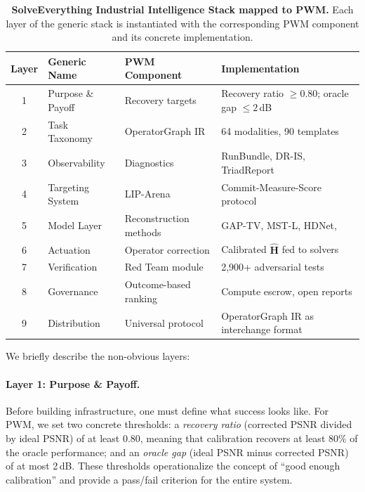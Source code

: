 \begin{table}[t]
\centering
\caption{%
  \textbf{SolveEverything Industrial Intelligence Stack mapped to PWM.}
  Each layer of the generic stack is instantiated with the corresponding
  PWM component and its concrete implementation.%
}
\label{tab:stack_mapping}
\smallskip
\renewcommand{\arraystretch}{1.15}
\begin{tabular}{@{}clll@{}}
\toprule
\textbf{Layer} & \textbf{Generic Name}   & \textbf{PWM Component}         & \textbf{Implementation} \\
\midrule
1 & Purpose \& Payoff       & Recovery targets               & Recovery ratio $\geq 0.80$; oracle gap $\leq 2$\,dB \\
2 & Task Taxonomy           & OperatorGraph IR                & 64 modalities, 90 templates \\
3 & Observability           & Diagnostics                     & RunBundle, DR-IS, TriadReport \\
4 & Targeting System        & LIP-Arena                       & Commit-Measure-Score protocol \\
5 & Model Layer             & Reconstruction methods          & GAP-TV, MST-L, HDNet, \etc{} \\
6 & Actuation               & Operator correction             & Calibrated $\hat{\mathbf{H}}$ fed to solvers \\
7 & Verification            & Red Team module                 & 2{,}900+ adversarial tests \\
8 & Governance              & Outcome-based ranking           & Compute escrow, open reports \\
9 & Distribution            & Universal protocol              & OperatorGraph IR as interchange format \\
\bottomrule
\end{tabular}
\end{table}

We briefly describe the non-obvious layers:

\paragraph{Layer 1: Purpose \& Payoff.}
Before building infrastructure, one must define what success looks like.
For PWM, we set two concrete thresholds: a \emph{recovery ratio}
(corrected PSNR divided by ideal PSNR) of at least 0.80, meaning that
calibration recovers at least 80\% of the oracle performance; and an
\emph{oracle gap} (ideal PSNR minus corrected PSNR) of at most 2\,dB.
These thresholds operationalize the concept of ``good enough
calibration'' and provide a pass/fail criterion for the entire system.

